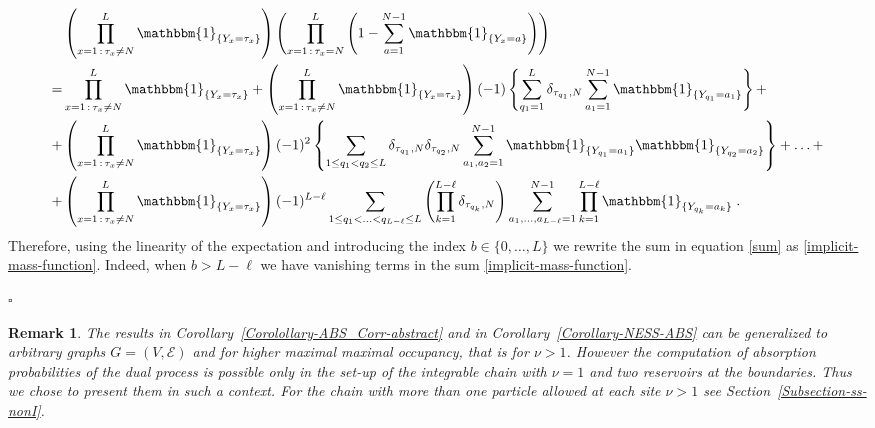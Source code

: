\documentclass[10pt]{article}
\numberwithin{equation}{section}
\numberwithin{equation}{subsection}
\newtheorem{remark}{Remark}
\newcommand{\dt}{\;.}
\begin{document}
\begin{align}\label{sum}
&\left(\prod_{x=1\,:\,\tau_{x}\neq N}^{L}\mathbbm{1}_{\{Y_x=\tau_{x}\}}\right)\left(\prod_{x=1\,:\,\tau_{x}=N}^{L}\left(1-\sum_{a=1}^{N-1}\mathbbm{1}_{\{Y_x=a\}}\right)\right)\nonumber\\
=&
\prod_{x=1\,:\,\tau_{x}\neq N}^{L}\mathbbm{1}_{\{Y_x=\tau_{x}\}}+\left(\prod_{x=1\,:\,\tau_{x}\neq N}^{L}\mathbbm{1}_{\{Y_x=\tau_{x}\}}\right)(-1)\left\{\sum_{q_{1}=1}^{L}\delta_{\tau_{q_{1}},N}\sum_{a_{1}=1}^{N-1}\mathbbm{1}_{\{Y_{q_{1}}
=
a_{1}\}}\right\}+\nonumber\\
+&\left(\prod_{x=1\,:\,\tau_{x}\neq N}^{L}\mathbbm{1}_{\{Y_x=\tau_{x}\}}\right)(-1)^{2}\left\{\sum_{1\leq q_{1}<q_{2}\leq L}\delta_{\tau_{q_{1}},N}\delta_{\tau_{q_{2}},N}\sum_{a_{1},a_{2}=1}^{N-1}\mathbbm{1}_{\{Y_{q_{1}}=a_{1}\}}\mathbbm{1}_{\{Y_{q_{2}}=a_{2}\}}\right\}+\ldots+
\nonumber\\
+&\left(\prod_{x=1\,:\,\tau_{x}\neq N}^{L}\mathbbm{1}_{\{Y_x=\tau_{x}\}}\right)(-1)^{L-\ell}\sum_{1\leq q_{1}<\ldots<q_{L-\ell}\leq L}\left(\prod_{k=1}^{L-\ell}\delta_{\tau_{q_{k}},N}\right)\sum_{a_{1},\ldots,a_{L-\ell}=1}^{N-1}\prod_{k=1}^{L-\ell}\mathbbm{1}_{\{Y_{q_{k}}=a_{k}\}}\dt
\end{align} 
Therefore, using the linearity of the expectation and introducing the index $b\in \{0,\ldots,L\}$ {\color{blue} we rewrite the sum in equation \eqref{sum} as} \eqref{implicit-mass-function}. {\color{blue} Indeed, when $b>L-\ell$ we have vanishing terms in the sum \eqref{implicit-mass-function}.}
\begin{flushright}
	$\square$
\end{flushright}
\begin{remark}\label{Remark-extension-graph-nu}
	The results in Corollary~\ref{Corolollary-ABS_Corr-abstract} and in Corollary~\ref{Corollary-NESS-ABS}  can be generalized to arbitrary graphs $G=(V,\mathcal{E})$ and for {\color{blue} higher maximal maximal occupancy}, that is for $\nu >1$.
	However the computation of absorption probabilities of the dual process is possible only in the set-up of the integrable chain with $\nu =1$ and two reservoirs at the boundaries.
	Thus we chose to present them in such a context. For the chain with {\color{blue} more than one particle allowed at each site} $\nu >1$ see Section~\ref{Subsection-ss-nonI}.
\end{remark}
\end{document}
